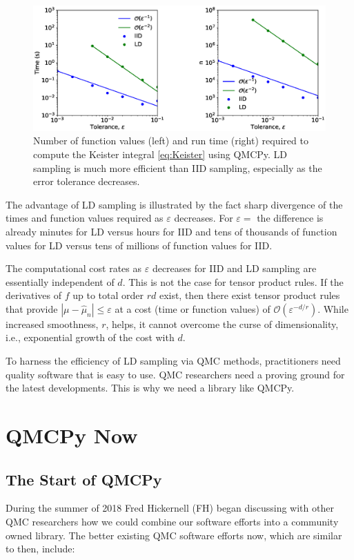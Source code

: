 \documentclass[11pt]{NSFamsart}
\def\abs#1{\ensuremath{\left \lvert #1 \right \rvert}}
\newcommand{\Order}{\mathcal{O}}
\newcommand{\hmu}{\hat{\mu}}
\begin{document}
\begin{figure}
    \centering
    \includegraphics[height = 5.5 cm]{ProgramsImages/keister_timing.eps}
    \caption{Number of function values (left) and run time (right) required to compute the Keister integral \eqref{eq:Keister} using QMCPy.  LD sampling is much more efficient than IID sampling, especially as the error tolerance decreases.}
    \label{fig:KeisterTimes}
\end{figure}

The advantage of LD sampling is illustrated by the fact sharp divergence of the times and function values required as $\varepsilon$ decreases.  For $\varepsilon = $ the difference is already minutes for LD versus hours for IID and tens of thousands of function values for LD versus tens of millions of function values for IID.

The computational cost rates as $\varepsilon$ decreases for IID and LD sampling are essentially independent of $d$.  This is not the case for tensor product rules.  If the derivatives of $f$ up to total order $rd$ exist, then there exist tensor product rules that provide $\abs{\mu - \hmu_n} \le \varepsilon$  at a cost (time or function values) of $\Order(\varepsilon^{-d/r})$.  While increased smoothness, $r$, helps, it cannot overcome the curse of dimensionality, i.e., exponential growth of the cost with $d$.

To harness the efficiency of LD sampling via QMC methods, practitioners need quality software that is easy to use.  QMC researchers need a proving ground for the latest developments.  This is why we need a library like QMCPy.

\section{QMCPy Now}

\subsection{The Start of QMCPy}
During the summer of 2018 Fred Hickernell (FH) began discussing with other QMC researchers how we could combine our software efforts into a community owned library.  The better existing QMC software efforts now, which are similar to then, include:
\end{document}
